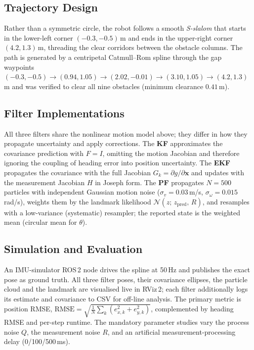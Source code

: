 \documentclass[conference]{IEEEtran}
\begin{document}
\subsection{Trajectory Design}

Rather than a symmetric circle, the robot follows a smooth \emph{S-slalom} that
starts in the lower-left corner $(-0.3,-0.5)$\,m and ends in the upper-right
corner $(4.2, 1.3)$\,m, threading the clear corridors between the obstacle
columns.
The path is generated by a centripetal Catmull--Rom spline through the gap
waypoints $(-0.3,-0.5)\!\to\!(0.94,1.05)\!\to\!(2.02,-0.01)\!\to\!(3.10,1.05)
\!\to\!(4.2,1.3)$\,m and was verified to clear all nine obstacles
(minimum clearance $0.41$\,m).

\subsection{Filter Implementations}

All three filters share the nonlinear motion model above; they differ in how
they propagate uncertainty and apply corrections.
The \textbf{KF} approximates the covariance prediction with $F=I$, omitting the
motion Jacobian and therefore ignoring the coupling of heading error into
position uncertainty.
The \textbf{EKF} propagates the covariance with the full Jacobian
$G_k=\partial g/\partial \mathbf{x}$ and updates with the measurement Jacobian
$H$ in Joseph form.
The \textbf{PF} propagates $N{=}500$ particles with independent Gaussian motion
noise ($\sigma_v{=}0.03$\,m/s, $\sigma_\omega{=}0.015$\,rad/s), weights them by
the landmark likelihood $\mathcal{N}(z;\,z_\text{pred},\,R)$, and resamples with
a low-variance (systematic) resampler; the reported state is the weighted mean
(circular mean for $\theta$).

\subsection{Simulation and Evaluation}

An IMU-simulator ROS\,2 node drives the spline at 50\,Hz and publishes the exact
pose as ground truth.
All three filter poses, their covariance ellipses, the particle cloud and the
landmark are visualised live in RViz\,2; each filter additionally logs its
estimate and covariance to CSV for off-line analysis.
The primary metric is position RMSE,
$\text{RMSE} = \sqrt{\tfrac{1}{N}\sum_k (e_{x,k}^2 + e_{y,k}^2)}$,
complemented by heading RMSE and per-step runtime.
The mandatory parameter studies vary the process noise $Q$, the measurement
noise $R$, and an artificial measurement-processing delay (0/100/500\,ms).
\end{document}
